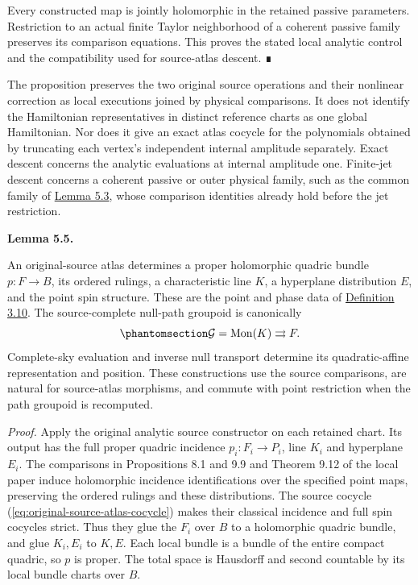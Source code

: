 \documentclass[
  english,
  11pt,
  reqno]{amsart}
\makeatletter
\newcommand{\pandocstatementheading}[1]{%
  \par\addpenalty{\@beginparpenalty}%
  \addvspace{.5\baselineskip plus .2\baselineskip minus .2\baselineskip}%
  {\normalfont\bfseries #1\par}%
  \nobreak\@afterindenttrue\@afterheading
}
\makeatother
\begin{document}
Every constructed map is jointly holomorphic in the retained passive
parameters. Restriction to an actual finite Taylor neighborhood of a
coherent passive family preserves its comparison equations. This proves
the stated local analytic control and the compatibility used for
source-atlas descent. ∎

The proposition preserves the two original source operations and their
nonlinear correction as local executions joined by physical comparisons.
It does not identify the Hamiltonian representatives in distinct
reference charts as one global Hamiltonian. Nor does it give an exact
atlas cocycle for the polynomials obtained by truncating each vertex's
independent internal amplitude separately. Exact descent concerns the
analytic evaluations at internal amplitude one. Finite-jet descent
concerns a coherent passive or outer physical family, such as the common
family of \hyperref[lem:compatible-source-amplitude-diagrams]{Lemma
5.3}, whose comparison identities already hold before the jet
restriction.

\pandocstatementheading{\protect{}\label{lem:source-atlas-phase-completion}Lemma 5.5.}

An original-source atlas determines a proper holomorphic quadric bundle
\(p:F\to B\), its ordered rulings, a characteristic line \(K\), a
hyperplane distribution \(E\), and the point spin structure. These are
the point and phase data of
\hyperref[def:independent-monodromy-source-v092]{Definition 3.10}. The
source-complete null-path groupoid is canonically
\begin{equation}\protect\phantomsection\label{eq:source-atlas-monodromy-completion}{
\mathcal G=\operatorname{Mon}(K)\rightrightarrows F.
}\end{equation} Complete-sky evaluation and inverse null transport
determine its quadratic-affine representation and position. These
constructions use the source comparisons, are natural for source-atlas
morphisms, and commute with point restriction when the path groupoid is
recomputed.

\emph{Proof.} Apply the original analytic source constructor on each
retained chart. Its output has the full proper quadric incidence
\(p_i:F_i\to P_i\), line \(K_i\) and hyperplane \(E_i\). The comparisons
in Propositions 8.1 and 9.9 and Theorem 9.12 of the local paper induce
holomorphic incidence identifications over the specified point maps,
preserving the ordered rulings and these distributions. The source
cocycle (\ref{eq:original-source-atlas-cocycle}) makes their classical
incidence and full spin cocycles strict. Thus they glue the \(F_i\) over
\(B\) to a holomorphic quadric bundle, and glue \(K_i,E_i\) to \(K,E\).
Each local bundle is a bundle of the entire compact quadric, so \(p\) is
proper. The total space is Hausdorff and second countable by its local
bundle charts over \(B\).
\end{document}
